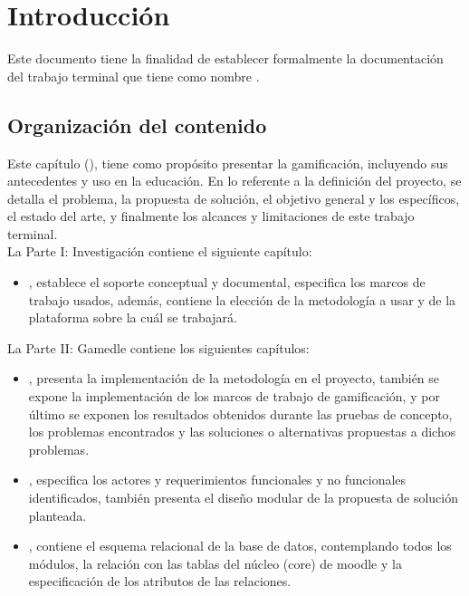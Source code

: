 \chapter{Introducción}
\label{ch:introduccion}

Este documento tiene la finalidad de establecer formalmente la documentación del trabajo terminal {\numeroTT} que tiene como nombre {\bf\tituloTT}.

\section{Organización del contenido}

 Este capítulo (), tiene como propósito presentar la gamificación, incluyendo sus antecedentes y uso en la educación. En lo referente a la definición del proyecto, se detalla el problema, la propuesta de solución, el objetivo general y los específicos, el estado del arte, y finalmente los alcances y limitaciones de este trabajo terminal.\\

 \noindent La {\pf Parte I: Investigación} contiene el siguiente capítulo:%

    \begin{itemize}
        \item {}, establece el soporte conceptual y documental,
        especifica los marcos de trabajo usados, además, contiene la elección de la
        metodología a usar y de la plataforma sobre la cuál se trabajará.

    \end{itemize}

\noindent La {\pf Parte II: Gamedle} contiene los siguientes capítulos:%

\begin{itemize}

    \item {}, presenta la implementación de la metodología en el proyecto,
    también se expone la implementación de los marcos de trabajo de gamificación, y por último
    se exponen los resultados obtenidos durante las pruebas de concepto, los problemas encontrados
    y las soluciones o alternativas propuestas a dichos problemas.

    \item {}, especifica los actores y requerimientos funcionales
    y no funcionales identificados, también presenta el diseño modular de la propuesta
    de solución planteada.

    \item {}, contiene el esquema relacional de la base de
    datos, contemplando todos los módulos, la relación con las tablas del núcleo (core)
    de moodle y la especificación de los atributos de las relaciones.
\end{itemize}

